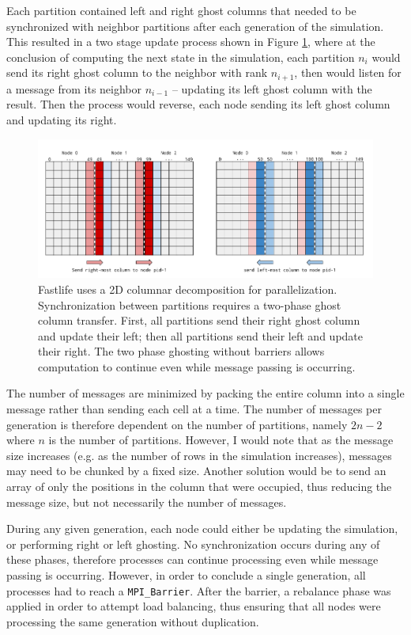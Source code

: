 \documentclass[11pt,letterpaper]{article}
\begin{document}
Each partition contained left and right ghost columns that needed to be synchronized with neighbor partitions after each generation of the simulation. This resulted in a two stage update process shown in Figure \ref{fig:columnar_decomposition}, where at the conclusion of computing the next state in the simulation, each partition $n_i$ would send its right ghost column to the neighbor with rank $n_{i+1}$, then would listen for a message from its neighbor $n_{i-1}$ -- updating its left ghost column with the result. Then the process would reverse, each node sending its left ghost column and updating its right.

\begin{figure}
	\centering
    \includegraphics[width=\textwidth]{figures/columnar_decomposition.png}
    \caption{\textsf{Fastlife uses a 2D columnar decomposition for parallelization. Synchronization between partitions requires a two-phase ghost column transfer. First, all partitions send their right ghost column and update their left; then all partitions send their left and update their right. The two phase ghosting without barriers allows computation to continue even while message passing is occurring.}}
    \label{fig:columnar_decomposition}
\end{figure}

The number of messages are minimized by packing the entire column into a single message rather than sending each cell at a time. The number of messages per generation is therefore dependent on the number of partitions, namely $2n-2$ where $n$ is the number of partitions. However, I would note that as the message size increases (e.g. as the number of rows in the simulation increases), messages may need to be chunked by a fixed size. Another solution would be to send an array of only the positions in the column that were occupied, thus reducing the message size, but not necessarily the number of messages.

During any given generation, each node could either be updating the simulation, or performing right or left ghosting. No synchronization occurs during any of these phases, therefore processes can continue processing even while message passing is occurring. However, in order to conclude a single generation, all processes had to reach a \texttt{MPI\_Barrier}. After the barrier, a rebalance phase was applied in order to attempt load balancing, thus ensuring that all nodes were processing the same generation without duplication.
\end{document}
